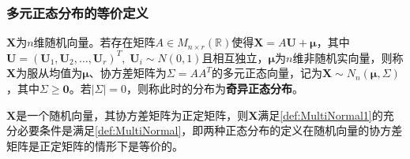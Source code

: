 \subsubsection{多元正态分布的等价定义}
\begin{definition}\label{def:MultiNormal}
	$\mathbf{X}$为$n$维随机向量。若存在矩阵$A\in M_{n\times r}(\mathbb{R})$使得$\mathbf{X}=A\mathbf{U}+\boldsymbol{\mu}$，其中$\mathbf{U}=(\mathbf{U}_1,\mathbf{U}_2,\dots,\mathbf{U}_r)^T,\;\mathbf{U}_i\sim N(0,1)$且相互独立，$\boldsymbol{\mu}$为$n$维非随机实向量，则称$\mathbf{X}$为服从均值为$\boldsymbol{\mu}$、协方差矩阵为$\Sigma=AA^T$的多元正态向量，记为$\mathbf{X}\sim N_n(\boldsymbol{\mu},\Sigma)$，其中$\Sigma\geqslant\mathbf{0}$。若$|\Sigma|=0$，则称此时的分布为\textbf{奇异正态分布}。
\end{definition}
\begin{theorem}
	$\mathbf{X}$是一个随机向量，其协方差矩阵为正定矩阵，则$\mathbf{X}$满足\cref{def:MultiNormal1}的充分必要条件是满足\cref{def:MultiNormal}，即两种正态分布的定义在随机向量的协方差矩阵是正定矩阵的情形下是等价的。
\end{theorem}
